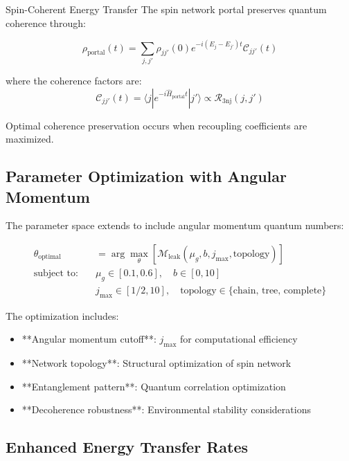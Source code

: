 \documentclass[12pt]{article}
\begin{document}
\begin{resultbox}{Spin-Coherent Energy Transfer}
The spin network portal preserves quantum coherence through:

\begin{equation}
\rho_{\text{portal}}(t) = \sum_{j,j'} \rho_{jj'}(0) e^{-i(E_j - E_{j'})t} \mathcal{C}_{jj'}(t)
\end{equation}

where the coherence factors are:
\begin{equation}
\mathcal{C}_{jj'}(t) = \langle j | e^{-i\hat{H}_{\text{portal}}t} | j' \rangle \propto \mathcal{R}_{\text{3nj}}(j,j')
\end{equation}

Optimal coherence preservation occurs when recoupling coefficients are maximized.
\end{resultbox}

\subsection{Parameter Optimization with Angular Momentum}

The parameter space extends to include angular momentum quantum numbers:

\begin{align}
\theta_{\text{optimal}} &= \arg\max_{\theta} \left[ \mathcal{M}_{\text{leak}}(\mu_g, b, j_{\max}, \text{topology}) \right] \\
\text{subject to:} \quad &\mu_g \in [0.1, 0.6], \quad b \in [0, 10] \\
&j_{\max} \in [1/2, 10], \quad \text{topology} \in \{\text{chain, tree, complete}\}
\end{align}

The optimization includes:
\begin{itemize}
\item **Angular momentum cutoff**: $j_{\max}$ for computational efficiency
\item **Network topology**: Structural optimization of spin network
\item **Entanglement pattern**: Quantum correlation optimization
\item **Decoherence robustness**: Environmental stability considerations
\end{itemize}

\subsection{Enhanced Energy Transfer Rates}
\end{document}
